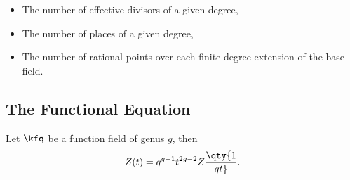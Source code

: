 \begin{itemize}
\item
  The number of effective divisors of a given degree,
\item
  The number of places of a given degree,
\item
  The number of rational points over each finite degree extension of the
  base field.
\end{itemize}

\hypertarget{the-functional-equation}{%
\subsection{The Functional Equation}\label{the-functional-equation}}

\begin{theorem}

Let \(\kfq\) be a function field of genus \(g\), then
\begin{align*}  
Z(t) = q^{g-1} t^{2g-2} Z\qty{1\over qt}
.\end{align*}

\end{theorem}


